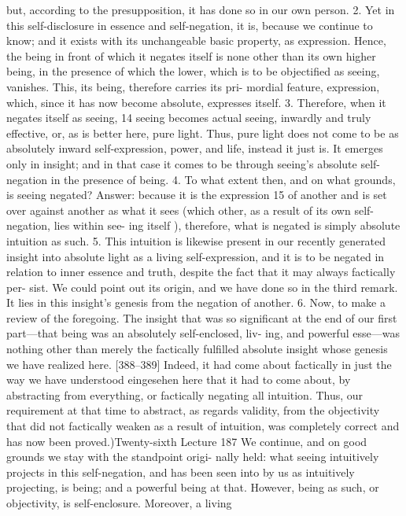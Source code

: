 but, according to the presupposition, it has done so in our own person.
2. Yet in this self-disclosure in essence and self-negation, it is, because we
continue to know; and it exists with its unchangeable basic property, as
expression. Hence, the being in front of which it negates itself is none other
than its own higher being, in the presence of which the lower, which is to
be objectified as seeing, vanishes. This, its being, therefore carries its pri-
mordial feature, expression, which, since it has now become absolute,
expresses itself.
3. Therefore, when it negates itself as seeing, 14 seeing becomes actual seeing,
inwardly and truly effective, or, as is better here, pure light. Thus, pure light
does not come to be as absolutely inward self-expression, power, and life,
instead it just is. It emerges only in insight; and in that case it comes to be
through seeing’s absolute self-negation in the presence of being.
4. To what extent then, and on what grounds, is seeing negated? Answer:
because it is the expression 15 of another and is set over against another as
what it sees (which other, as a result of its own self-negation, lies within see-
ing itself ), therefore, what is negated is simply absolute intuition as such.
5. This intuition is likewise present in our recently generated insight into
absolute light as a living self-expression, and it is to be negated in relation
to inner essence and truth, despite the fact that it may always factically per-
sist. We could point out its origin, and we have done so in the third remark.
It lies in this insight’s genesis from the negation of another.
6. Now, to make a review of the foregoing. The insight that was so significant
at the end of our first part—that being was an absolutely self-enclosed, liv-
ing, and powerful esse—was nothing other than merely the factically fulfilled
absolute insight whose genesis we have realized here. [388–389] Indeed, it
had come about factically in just the way we have understood {eingesehen}
here that it had to come about, by abstracting from everything, or factically
negating all intuition. Thus, our requirement at that time to abstract, as
regards validity, from the objectivity that did not factically weaken as a result
of intuition, was completely correct and has now been proved.)Twenty-sixth Lecture
187
We continue, and on good grounds we stay with the standpoint origi-
nally held: what seeing intuitively projects in this self-negation, and has been
seen into by us as intuitively projecting, is being; and a powerful being at that.
However, being as such, or objectivity, is self-enclosure. Moreover, a living
